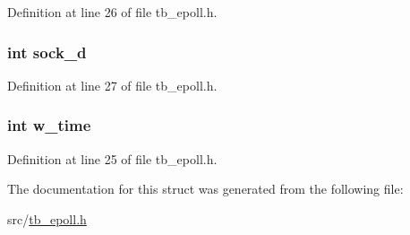 Definition at line 26 of file tb\-\_\-epoll.\-h.

\hypertarget{structtb__epoll__t_a94d540b145f21be2f9b28a2c225ccf30}{
\subsubsection[{sock\-\_\-d}]{\setlength{\rightskip}{0pt plus 5cm}int sock\-\_\-d}}\label{structtb__epoll__t_a94d540b145f21be2f9b28a2c225ccf30}


Definition at line 27 of file tb\-\_\-epoll.\-h.

\hypertarget{structtb__epoll__t_a19a7826f48a7614bfecc19d92180bdf2}{
\subsubsection[{w\-\_\-time}]{\setlength{\rightskip}{0pt plus 5cm}int w\-\_\-time}}\label{structtb__epoll__t_a19a7826f48a7614bfecc19d92180bdf2}


Definition at line 25 of file tb\-\_\-epoll.\-h.



The documentation for this struct was generated from the following file\-:\begin{DoxyCompactItemize}
\item 
src/\hyperlink{tb__epoll_8h}{tb\-\_\-epoll.\-h}\end{DoxyCompactItemize}

